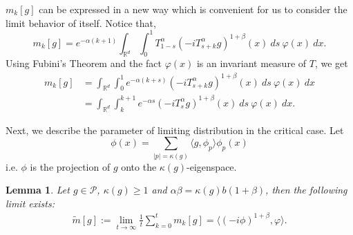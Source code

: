 \documentclass{article}
\newtheorem{lemma}{Lemma}[section]
\begin{document}
$m_k[g]$ can be expressed in a new way which is convenient for us to consider the limit behavior of itself. Notice that, 
$$m_k[g]=e^{-\alpha(k+1)}\int_{\mathbb{R}^d}\int_0^1 T_{1-s}^{\alpha}(-iT_{s+k}^{\alpha}g)^{1+\beta}(x)~ds~\varphi(x)~dx.$$
Using Fubini's Theorem and the fact $\varphi(x)$ is an invariant measure of $T$, we get  
\begin{align}
    m_k[g]&=\int_{\mathbb{R}^d}\int_0^1 e^{-\alpha(k+s)}(-iT_{s+k}^{\alpha}g)^{1+\beta}(x)~ds~\varphi(x)~dx\nonumber\\
    &=\int_{\mathbb{R}^d}\int_k^{k+1} e^{-\alpha s}(-iT_{s}^{\alpha}g)^{1+\beta}(x)~ds~\varphi(x)~dx.\label{mkeq}
\end{align}

Next, we describe the parameter of limiting distribution in the critical case. Let 
$$\phi(x)=\sum_{|p|=\kappa(g)}\langle g, \phi_p\rangle\phi_p(x)$$
i.e. $\phi$ is the projection of $g$ onto the $\kappa(g)$-eigenspace.
\begin{lemma}\label{lemma210}
Let $g \in \mathcal{P}$, $\kappa(g)\geq 1$ and $\alpha\beta=\kappa(g)b(1+\beta)$, then the following limit exists:
\begin{align}
    \tilde{m}[g]:=\lim_{t\rightarrow \infty}\frac{1}{t}\sum_{k=0}^{t}m_k[g]=\langle(-i\phi)^{1+\beta},\varphi\rangle.
\end{align}
\end{lemma}
\end{document}
